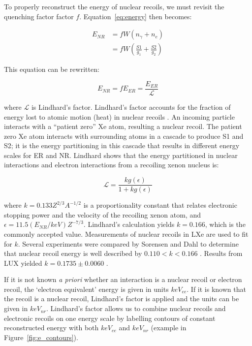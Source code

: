 To properly reconstruct the energy of nuclear recoils, we must revisit the quenching factor factor $f$. Equation~\ref{eq:energy} then becomes:

 \begin{equation}
 \begin{split}
E_{NR} &= f W (n_{\gamma} + n_{e} ) \\
   &= f W (\frac{S1}{g_{1}} + \frac{S2}{g_{2}})
 \end{split}
\end{equation}

This equation can be rewritten:

 \begin{equation}
 \label{eq:combined_energy}
E_{NR} = f E_{ER} = \frac{E_{ER}}{\mathcal{L}}
\end{equation}

where $\mathcal{L}$ is Lindhard's factor. Lindhard's factor accounts for the fraction of energy lost to atomic motion (heat) in nuclear recoils \cite{Lindhard1963}. An incoming particle interacts with a ``patient zero'' Xe atom, resulting a nuclear recoil. The patient zero Xe atom interacts with surrounding atoms in a cascade to produce S1 and S2; it is the energy partitioning in this cascade that results in different energy scales for \ac{ER} and \ac{NR}. Lindhard shows that the energy partitioned in nuclear interactions and electron interactions from a recoiling xenon nucleus is:

 \begin{equation}
 \label{eq:lindhard}
\mathcal{L} = \frac{k g(\epsilon)}{1 + k g(\epsilon)}
\end{equation}

where $k = 0.133 Z^{2/3} A^{-1/2}$ is a proportionality constant that relates electronic stopping power and the velocity of the recoiling xenon atom, and $\epsilon = 11.5 (E_{NR}/keV) Z^{-7/3}$. Lindhard's calculation yields $k=0.166$, which is the commonly accepted value. Measurements of nuclear recoils in \ac{LXe} are used to fit for $k$. Several experiments were compared by Sorensen and Dahl to determine that nuclear recoil energy is well described by $0.110 < k < 0.166$ \cite{Sorensen2011}. Results from \ac{LUX} yielded $k = 0.1735 \pm 0.0060$ \cite{LUX:DD}. 


If it is not known \textit{a priori} whether an interaction is a nuclear recoil or electron recoil, the `electron equivalent' energy is given in units $keV_{ee}$. If it is known that the recoil is a nuclear recoil, Lindhard's factor is applied and the units can be given in $keV_{nr}$. Lindhard's factor allows us to combine nuclear recoils and electronic recoils on one energy scale by labelling contours of constant reconstructed energy with both $keV_{ee}$ and $keV_{nr}$ (example in Figure~\ref{fig:e_contours}).


